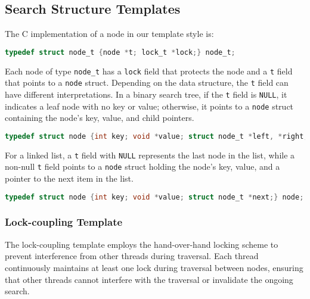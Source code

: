 \documentclass[a4paper,UKenglish,cleveref, autoref, thm-restate]{lipics-v2021}
\begin{document}
\subsection{Search Structure Templates}
\label{templates}
The C implementation of a node in our template style is:
\begin{lstlisting}[language = C, backgroundcolor=\color{white}, basicstyle=\ttfamily\footnotesize]
typedef struct node_t {node *t; lock_t *lock;} node_t;
\end{lstlisting}

Each node of type \lstinline{node_t} has a \lstinline{lock} field that protects the node and a \lstinline{t} field that points to a \lstinline{node} struct. Depending on the data structure, the \lstinline{t} field can have different interpretations. In a binary search tree, if the \lstinline{t} field is \lstinline{NULL}, it indicates a leaf node with no key or value; otherwise, it points to a \lstinline{node} struct containing the node's key, value, and child pointers. 
\begin{lstlisting}[language = C, backgroundcolor=\color{white}, basicstyle=\ttfamily\footnotesize]
typedef struct node {int key; void *value; struct node_t *left, *right;} node;
\end{lstlisting}

For a linked list, a \lstinline{t} field with \lstinline{NULL} represents the last node in the list, while a non-null \lstinline{t} field points to a \lstinline{node} struct holding the node's key, value, and a pointer to the next item in the list. 

\begin{lstlisting}[language = C, backgroundcolor=\color{white}, basicstyle=\ttfamily\footnotesize]
typedef struct node {int key; void *value; struct node_t *next;} node;
\end{lstlisting}


\subsubsection{Lock-coupling Template}
\label{lock-coupling-algo}
The lock-coupling template employs the hand-over-hand locking scheme to prevent interference from other threads during traversal. Each thread continuously maintains at least one lock during traversal between nodes, ensuring that other threads cannot interfere with the traversal or invalidate the ongoing search.
\end{document}

